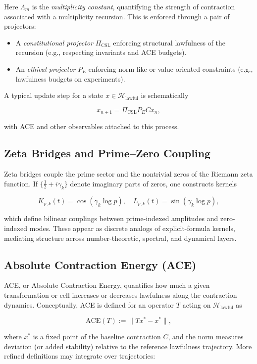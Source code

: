 \documentclass[11pt]{article}
\begin{document}
Here \(\Lambda_m\) is the \emph{multiplicity constant}, quantifying the strength of contraction associated with a multiplicity recursion. This is enforced through a pair of projectors:

\begin{itemize}[leftmargin=*]
  \item A \emph{constitutional projector} \(\Pi_{\mathrm{CSL}}\) enforcing structural lawfulness of the recursion (e.g., respecting invariants and ACE budgets).
  \item An \emph{ethical projector} \(P_E\) enforcing norm-like or value-oriented constraints (e.g., lawfulness budgets on experiments).
\end{itemize}

A typical update step for a state \(x \in \mathcal{H}_\text{lawful}\) is schematically

\[
x_{n+1} = \Pi_{\mathrm{CSL}} P_E C x_n,
\]

with ACE and other observables attached to this process.

\subsection{Zeta Bridges and Prime--Zero Coupling}

Zeta bridges couple the prime sector and the nontrivial zeros of the Riemann zeta function. If \(\{\tfrac{1}{2} + i \gamma_k\}\) denote imaginary parts of zeros, one constructs kernels

\[
K_{p,k}(t) = \cos(\gamma_k \log p), \quad L_{p,k}(t) = \sin(\gamma_k \log p),
\]

which define bilinear couplings between prime-indexed amplitudes and zero-indexed modes. These appear as discrete analogs of explicit-formula kernels, mediating structure across number-theoretic, spectral, and dynamical layers.

\subsection{Absolute Contraction Energy (ACE)}

ACE, or Absolute Contraction Energy, quantifies how much a given transformation or cell increases or decreases lawfulness along the contraction dynamics. Conceptually, ACE is defined for an operator \(T\) acting on \(\mathcal{H}_\text{lawful}\) as

\[
\mathrm{ACE}(T) := \| T x^\ast - x^\ast \|,
\]

where \(x^\ast\) is a fixed point of the baseline contraction \(C\), and the norm measures deviation (or added stability) relative to the reference lawfulness trajectory. More refined definitions may integrate over trajectories:
\end{document}
